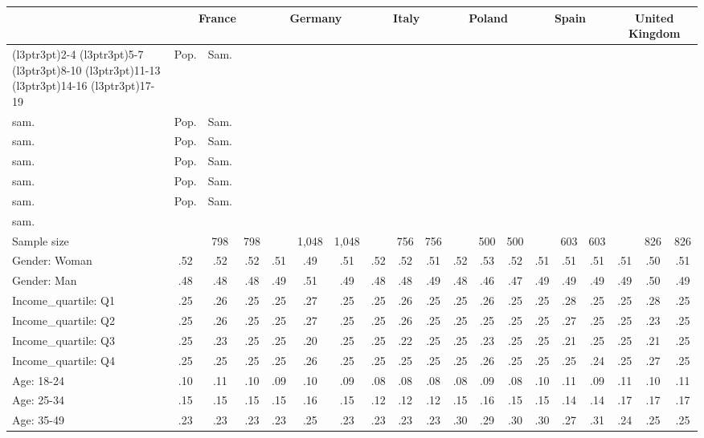 
\begin{tabular}[t]{lcccccccccccccccccc}
\toprule
\multicolumn{1}{c}{} & \multicolumn{3}{c}{France} & \multicolumn{3}{c}{Germany} & \multicolumn{3}{c}{Italy} & \multicolumn{3}{c}{Poland} & \multicolumn{3}{c}{Spain} & \multicolumn{3}{c}{United Kingdom} \\
\cmidrule(l{3pt}r{3pt}){2-4} \cmidrule(l{3pt}r{3pt}){5-7} \cmidrule(l{3pt}r{3pt}){8-10} \cmidrule(l{3pt}r{3pt}){11-13} \cmidrule(l{3pt}r{3pt}){14-16} \cmidrule(l{3pt}r{3pt}){17-19}
  & Pop. & Sam. & \makecell{Wght.\\sam.} & Pop. & Sam. & \makecell{Wght.\\sam.} & Pop. & Sam. & \makecell{Wght.\\sam.} & Pop. & Sam. & \makecell{Wght.\\sam.} & Pop. & Sam. & \makecell{Wght.\\sam.} & Pop. & Sam. & \makecell{Wght.\\sam.}\\
\midrule
Sample size &  & 798 & 798 &  & 1,048 & 1,048 &  & 756 & 756 &  & 500 & 500 &  & 603 & 603 &  & 826 & 826\\
\addlinespace
Gender: Woman & .52 & .52 & .52 & .51 & .49 & .51 & .52 & .52 & .51 & .52 & .53 & .52 & .51 & .51 & .51 & .51 & .50 & .51\\
Gender: Man & .48 & .48 & .48 & .49 & .51 & .49 & .48 & .48 & .49 & .48 & .46 & .47 & .49 & .49 & .49 & .49 & .50 & .49\\
\addlinespace
Income\_quartile: Q1 & .25 & .26 & .25 & .25 & .27 & .25 & .25 & .26 & .25 & .25 & .26 & .25 & .25 & .28 & .25 & .25 & .28 & .25\\
Income\_quartile: Q2 & .25 & .26 & .25 & .25 & .27 & .25 & .25 & .26 & .25 & .25 & .25 & .25 & .25 & .27 & .25 & .25 & .23 & .25\\
Income\_quartile: Q3 & .25 & .23 & .25 & .25 & .20 & .25 & .25 & .22 & .25 & .25 & .23 & .25 & .25 & .21 & .25 & .25 & .21 & .25\\
Income\_quartile: Q4 & .25 & .25 & .25 & .25 & .26 & .25 & .25 & .25 & .25 & .25 & .26 & .25 & .25 & .25 & .24 & .25 & .27 & .25\\
\addlinespace
Age: 18-24 & .10 & .11 & .10 & .09 & .10 & .09 & .08 & .08 & .08 & .08 & .09 & .08 & .10 & .11 & .09 & .11 & .10 & .11\\
Age: 25-34 & .15 & .15 & .15 & .15 & .16 & .15 & .12 & .12 & .12 & .15 & .16 & .15 & .15 & .14 & .14 & .17 & .17 & .17\\
Age: 35-49 & .23 & .23 & .23 & .23 & .25 & .23 & .23 & .23 & .23 & .30 & .29 & .30 & .30 & .27 & .31 & .24 & .25 & .25\\

\end{tabular}
